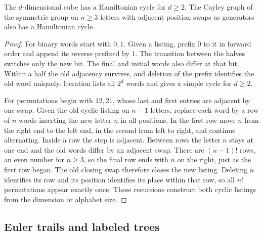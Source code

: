 \begin{proposition}\label{result25}
The $d$-dimensional cube has a Hamiltonian cycle for $d\ge2$. The Cayley graph of the symmetric group on $n\ge3$ letters with adjacent position swaps as generators also has a Hamiltonian cycle.
\end{proposition}
\begin{proof}
For binary words start with $0,1$. Given a listing, prefix $0$ to it in forward order and append its reverse prefixed by $1$. The transition between the halves switches only the new bit. The final and initial words also differ at that bit. Within a half the old adjacency survives, and deletion of the prefix identifies the old word uniquely. Iteration lists all $2^d$ words and gives a simple cycle for $d\ge2$.

For permutations begin with $12,21$, whose last and first entries are adjacent by one swap. Given the old cyclic listing on $n-1$ letters, replace each word by a row of $n$ words inserting the new letter $n$ in all positions. In the first row move $n$ from the right end to the left end, in the second from left to right, and continue alternating. Inside a row the step is adjacent. Between rows the letter $n$ stays at one end and the old words differ by an adjacent swap. There are $(n-1)!$ rows, an even number for $n\ge3$, so the final row ends with $n$ on the right, just as the first row began. The old closing swap therefore closes the new listing. Deleting $n$ identifies its row and its position identifies its place within that row, so all $n!$ permutations appear exactly once. These recursions construct both cyclic listings from the dimension or alphabet size.
\end{proof}

\subsection{Euler trails and labeled trees}


